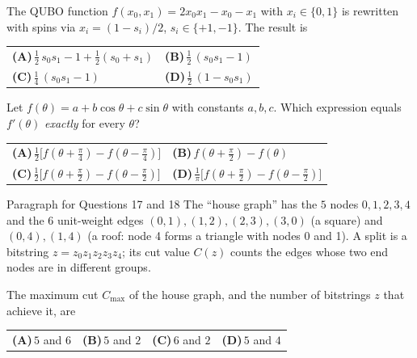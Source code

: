\documentclass[11pt,a4paper]{article}
\newcommand{\optlabel}[1]{\textbf{(#1)}}
\newenvironment{qitem}[1]{\begin{list}{}{\setlength{\leftmargin}{3.3em}\setlength{\labelwidth}{3.1em}%
  \setlength{\labelsep}{0.2em}\setlength{\topsep}{3pt}\setlength{\parsep}{3pt}}\item[\textbf{Q.#1}\hfill]}{\end{list}}
\newcommand{\qsep}{\par\vspace{2pt}{\color{black!15}\hrule}\vspace{4pt}}
\begin{document}
\begin{qitem}{15}
The QUBO function $f(x_0, x_1) = 2x_0x_1 - x_0 - x_1$ with $x_i \in \{0,1\}$ is rewritten with spins via
$x_i = (1 - s_i)/2$, $s_i \in \{+1, -1\}$. The result is
\par\smallskip\noindent\begin{tabularx}{\linewidth}{@{}*{2}{L}@{}}
\optlabel{A}\,$\tfrac12\,s_0s_1 - 1 + \tfrac12(s_0 + s_1)$ & \optlabel{B}\,$\tfrac12\,(s_0s_1 - 1)$ \\[3pt]
\optlabel{C}\,$\tfrac14\,(s_0s_1 - 1)$ & \optlabel{D}\,$\tfrac12\,(1 - s_0s_1)$
\end{tabularx}
\end{qitem}
\qsep

\begin{qitem}{16}
Let $f(\theta) = a + b\cos\theta + c\sin\theta$ with constants $a, b, c$. Which expression equals $f'(\theta)$
\emph{exactly} for every $\theta$?
\par\smallskip\noindent\begin{tabularx}{\linewidth}{@{}*{2}{L}@{}}
\optlabel{A}\,$\tfrac12\big[f(\theta + \tfrac\pi4) - f(\theta - \tfrac\pi4)\big]$ & \optlabel{B}\,$f(\theta + \tfrac\pi2) - f(\theta)$ \\[3pt]
\optlabel{C}\,$\tfrac12\big[f(\theta + \tfrac\pi2) - f(\theta - \tfrac\pi2)\big]$ & \optlabel{D}\,$\tfrac1\pi\big[f(\theta + \tfrac\pi2) - f(\theta - \tfrac\pi2)\big]$
\end{tabularx}
\end{qitem}
\qsep

\begin{passagebox}{Paragraph for Questions 17 and 18}
The ``house graph'' has the $5$ nodes $0, 1, 2, 3, 4$ and the $6$ unit-weight edges
$(0,1), (1,2), (2,3), (3,0)$ (a square) and $(0,4), (1,4)$ (a roof: node 4 forms a triangle with nodes 0 and 1).
A split is a bitstring $z = z_0z_1z_2z_3z_4$; its cut value $C(z)$ counts the edges whose two end nodes are in different
groups.
\end{passagebox}
\begin{qitem}{17}
The maximum cut $C_{\max}$ of the house graph, and the number of bitstrings $z$ that achieve it, are
\par\smallskip\noindent\begin{tabularx}{\linewidth}{@{}*{4}{L}@{}}
\optlabel{A}\,$5$ and $6$ & \optlabel{B}\,$5$ and $2$ & \optlabel{C}\,$6$ and $2$ & \optlabel{D}\,$5$ and $4$
\end{tabularx}
\end{qitem}
\qsep
\end{document}
